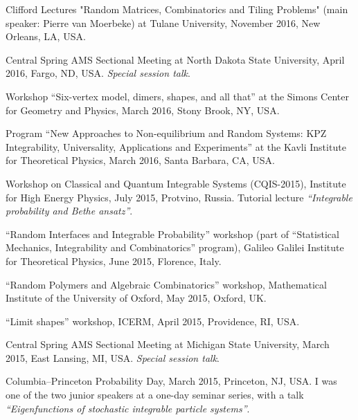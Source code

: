 \documentclass[letterpaper,11pt]{article}
\begin{document}
\begin{etaremune}
	\item
	      Clifford Lectures "Random Matrices, Combinatorics and Tiling
	      Problems" (main speaker: Pierre van Moerbeke) at Tulane University, November
	      2016, New Orleans, LA, USA.

	\item
	      Central Spring AMS Sectional Meeting at North Dakota State
	      University, April 2016, Fargo, ND, USA. \emph{Special session talk}.

	\item
	      Workshop ``Six-vertex model, dimers, shapes, and all that'' at
	      the Simons Center for Geometry and Physics, March 2016, Stony Brook, NY, USA.

	\item
	      Program ``New Approaches to Non-equilibrium and Random Systems:
	      KPZ Integrability, Universality, Applications and Experiments'' at the Kavli
	      Institute for Theoretical Physics, March 2016, Santa Barbara, CA, USA.

	\item
	      Workshop on Classical and Quantum Integrable Systems
	      (CQIS-2015), Institute for High Energy Physics, July 2015, Protvino, Russia.
	      Tutorial lecture \emph{``Integrable probability and Bethe   ansatz''}.

	\item
	      ``Random Interfaces and Integrable Probability'' workshop (part
	      of ``Statistical Mechanics, Integrability and Combinatorics''
	      program), Galileo Galilei Institute for Theoretical Physics, June 2015,
	      Florence, Italy.

	\item
	      ``Random Polymers and Algebraic Combinatorics'' workshop,
	      Mathematical Institute of the University of Oxford, May 2015,
	      Oxford, UK.

	\item
	      ``Limit shapes'' workshop, ICERM, April 2015, Providence, RI,
	      USA.   %

	\item
	      Central Spring AMS Sectional Meeting at Michigan State
	      University, March 2015, East Lansing, MI, USA. \emph{Special session talk}.

	\item
	      Columbia--Princeton Probability Day, March 2015, Princeton, NJ,
	      USA. I was one of the two junior speakers at a one-day seminar series, with a
	      talk \emph{``Eigenfunctions of stochastic integrable particle systems''}.


\end{etaremune}
\end{document}
